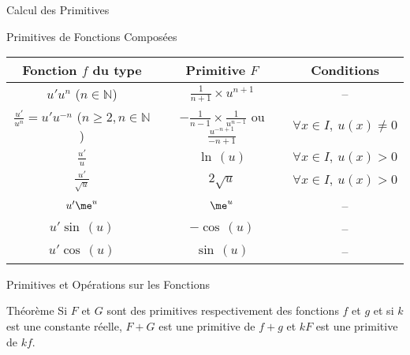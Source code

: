 \documentclass{cours}
\begin{document}
\begin{Gpartie}{Calcul des Primitives}
\begin{Spartie}{Primitives de Fonctions Composées}
            \begin{table}[H] \centering {}
                \begin{tabular}[c]{ @{}*{3}{C}@{} } \toprule
                    Fonction $f$ du type                                    & Primitive $F$                                                             & Conditions  \\ \midrule
                    $u'u^n$ ($n\in\mathbb{N}$)                              & $\frac{1}{n+1}\times u^{n+1}$                                             & \---\\
                    $\frac{u'}{u^n}=u'u^{-n}$ ($n\geq2, n\in\mathbb{N}$)   & $-\frac{1}{n-1}\times\frac{1}{u^{n-1}}$ ou $\frac{u^{-n+1}}{-n+1}$        & $\forall x\in I,\ u(x)\neq0$ \\
                    $\frac{u'}{u}$                                          & $\ln\,(u)$                                                                  & $\forall x\in I,\ u(x)>0$ \\
                    $\frac{u'}{\sqrt{u}}$                                   & $2\sqrt{u}$                                                               & $\forall x\in I,\ u(x)>0$ \\
                    $u'\me^u$                                                 & $\me^u$                                                                     & \---\\
                    $u'\sin\,(u)$                                             & $-\cos\,(u)$                                                                & \---\\
                    $u'\cos\,(u)$                                             & $\sin\,(u)$                                                                 & \---\\ \bottomrule
                \end{tabular}
            \end{table}
        \end{Spartie}
        \pagebreak
        \begin{Spartie}{Primitives et Opérations sur les Fonctions} 
            \begin{SSpartie}{Théorème} 
                Si $F$ et $G$ sont des primitives respectivement des fonctions $f$ et $g$ et si $k$ est une constante réelle, $F+G$ est une primitive de $f+g$ et $kF$ est une primitive de $kf$.
            \end{SSpartie}

\end{Spartie}
\end{Gpartie}
\end{document}
